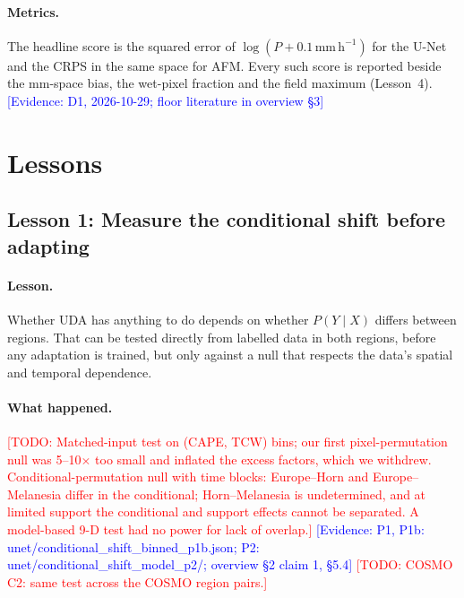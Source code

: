 \documentclass{article}
\newcommand{\todo}[1]{\textcolor{red}{[TODO: #1]}}
\newcommand{\ev}[1]{\textcolor{blue}{[Evidence: #1]}}
\begin{document}
\paragraph{Metrics.} The headline score is the squared error of
$\log(P+0.1\,\mathrm{mm\,h^{-1}})$ for the U-Net and the CRPS in the same
space for AFM. Every such score is reported beside the mm-space bias, the
wet-pixel fraction and the field maximum (Lesson~4).
\ev{D1, 2026-10-29; floor literature in overview \S3}

\section{Lessons}\label{sec:lessons}

\subsection{Lesson 1: Measure the conditional shift before adapting}
\label{sec:L1}

\paragraph{Lesson.} Whether UDA has anything to do depends on whether
$P(Y\mid X)$ differs between regions. That can be tested directly from
labelled data in both regions, before any adaptation is trained, but only
against a null that respects the data's spatial and temporal dependence.

\paragraph{What happened.} \todo{Matched-input test on (CAPE, TCW) bins;
our first pixel-permutation null was 5--10$\times$ too small and inflated
the excess factors, which we withdrew. Conditional-permutation null with
time blocks: Europe--Horn and Europe--Melanesia differ in the
conditional; Horn--Melanesia is undetermined, and at limited support the
conditional and support effects cannot be separated. A model-based 9-D
test had no power for lack of overlap.}
\ev{P1, P1b: unet/conditional\_shift\_binned\_p1b.json; P2:
unet/conditional\_shift\_model\_p2/; overview \S2 claim 1, \S5.4}
\todo{COSMO C2: same test across the COSMO region pairs.}
\end{document}
